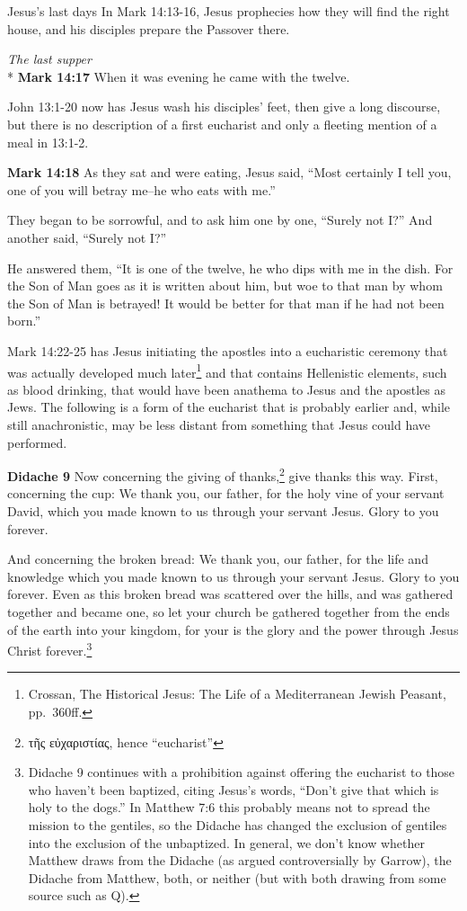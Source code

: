 \documentclass[10pt,twoside]{article} %
\newcommand{\doimage}[2]{\texttt{[image: \#2]}\label{fig:#2}}
\newcommand{\figbasic}[4]{ %
    \ifthenelse{\isodd{\pageref{fig:#2}}}{}{\hfill}
    \ifstrempty{#3}{
      \doimage{#1}{#2}
    }{
      \makebox{\doimage{#1}{#2} \\ #3}
    }
    \ifthenelse{\isodd{\pageref{fig:#2}}}{\hfill}{}
    \par
}
\newcommand{\fig}[2][0.4]{
  \figbasic{#1}{#2}{}{}
}
\newcommand{\quotesize}{\normalsize{}}
\newcommand{\comm}[1]{\begingroup \color{black!50} #1\endgroup}
\newenvironment{quotetext}{\begingroup\quotesize}{\endgroup}
\newcommand{\intex}[1]{\index[texts]{#1}}
\newcommand{\reftex}[1]{#1\intex{#1}}
\newcommand{\bible}[2]{\begin{quotetext}\textbf{#1}\intex{#1} #2\end{quotetext}}
\newcommand{\gospelmark}[2]{\bible{Mark #1}{#2}}
\newcommand{\subhead}[1]{\emph{#1}\\*}
\begin{document}
\begin{section}{Jesus's last days}
\comm{In \reftex{Mark 14:13-16}, Jesus prophecies how they will find the right house, and his disciples prepare the Passover there.}

\fig[1]{last-supper}

\subhead{The last supper}
\gospelmark{14:17}{
When it was evening he came with the twelve.}

\comm{John 13:1-20 now has Jesus wash his disciples' feet, then give a long discourse, but there is no description of
a first eucharist and only a fleeting mention of a meal in 13:1-2.}

\gospelmark{14:18}{
     As they sat and were eating, Jesus said, ``Most certainly I tell you, one of you will betray me--he who eats with me.''

  They began to be sorrowful, and to ask him one by one, ``Surely not I?'' And another said, ``Surely not I?''

  He answered them, ``It is one of the twelve, he who dips with me in the dish.    For the Son of Man goes as it is written about him, but woe to that man by whom the Son of Man is betrayed! It would be better for that man if he had not been born.''
}

\comm{Mark 14:22-25 has Jesus initiating the apostles into a eucharistic ceremony that was actually developed much 
later\footnote{Crossan, The Historical Jesus: The Life of a Mediterranean Jewish Peasant, pp.~360ff.}
and that contains Hellenistic elements, such as blood drinking, that would have been anathema
to Jesus and the apostles as Jews. The following is a form of the eucharist that
is probably earlier and, while still anachronistic, may be less distant from something that Jesus could have performed.}


\bible{Didache 9}{
Now concerning the giving of thanks,\footnote{τῆς εὐχαριστίας, hence  ``eucharist''} give thanks this way. First, concerning the cup:
We thank you, our father, for the holy vine of your servant David, which you made known to us through your servant Jesus.
Glory to you forever.

And concerning the broken bread:
We thank you, our father, for the life and knowledge which you made known to us through your servant Jesus.
Glory to you forever.
Even as this broken bread was scattered over the hills, and was gathered together and became one, so let
your church be gathered together from the ends of the earth into your kingdom, for your is the glory and the power through Jesus Christ 
forever.\footnote{Didache 9 continues with a prohibition against offering the eucharist to those who haven't been baptized,
citing Jesus's words, ``Don't give that which is holy to the dogs.'' In Matthew 7:6 this probably means not to spread the
mission to the gentiles, so the Didache has changed the exclusion of gentiles into the exclusion of the unbaptized.
In general, we don't know whether Matthew draws from
the Didache (as argued controversially by Garrow), the Didache from Matthew, both, or neither (but with both drawing from some
source such as Q).}
}


\end{section}
\end{document}
